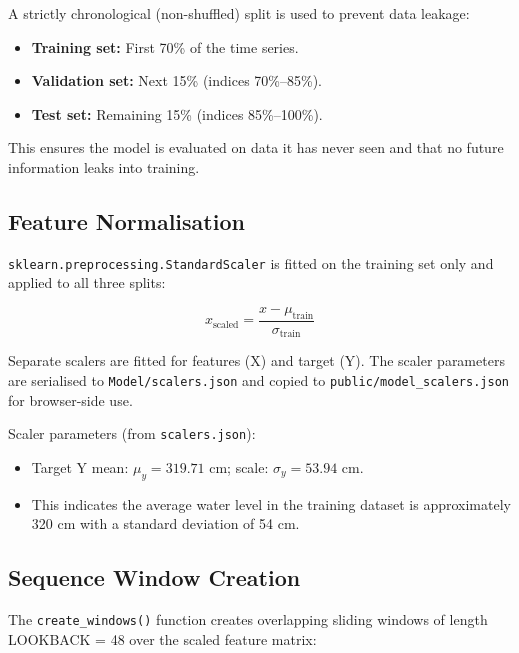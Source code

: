 A strictly chronological (non-shuffled) split is used to prevent data leakage:

\begin{itemize}[leftmargin=1.5em]
  \item \textbf{Training set:} First 70\% of the time series.
  \item \textbf{Validation set:} Next 15\% (indices 70\%--85\%).
  \item \textbf{Test set:} Remaining 15\% (indices 85\%--100\%).
\end{itemize}

This ensures the model is evaluated on data it has never seen and that no future information leaks into training.

\subsection{Feature Normalisation}

\texttt{sklearn.\allowbreak{}preprocessing.\allowbreak{}StandardScaler} is fitted on the training set only and applied to all three splits:

\begin{equation}
  x_{\text{scaled}} = \frac{x - \mu_{\text{train}}}{\sigma_{\text{train}}}
\end{equation}

Separate scalers are fitted for features (X) and target (Y). The scaler parameters are serialised to \texttt{Model/\allowbreak{}scalers.\allowbreak{}json} and copied to \texttt{public/\allowbreak{}model\_\allowbreak{}scalers.\allowbreak{}json} for browser-side use.

Scaler parameters (from \texttt{scalers.\allowbreak{}json}):
\begin{itemize}[leftmargin=1.5em]
  \item Target Y mean: $\mu_y = 319.71$ cm; scale: $\sigma_y = 53.94$ cm.
  \item This indicates the average water level in the training dataset is approximately 320 cm with a standard deviation of 54 cm.
\end{itemize}

\subsection{Sequence Window Creation}

The \texttt{create\_\allowbreak{}windows()} function creates overlapping sliding windows of length LOOKBACK = 48 over the scaled feature matrix:

